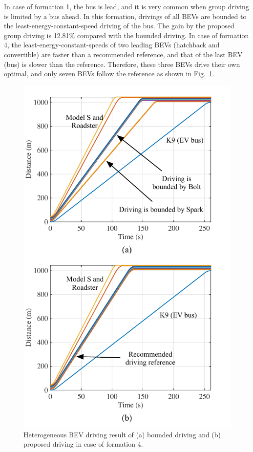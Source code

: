 \documentclass{IEEEtran}
\begin{document}
In case of formation 1, the bus is lead, and it is very common when group driving is limited by a bus ahead. In this formation, drivings of all BEVs are bounded to the least-energy-constant-speed driving of the bus. The gain by the proposed group driving is 12.81\% compared with the bounded driving.
In case of formation 4, the least-energy-constant-speeds of two leading BEVs (hatchback and convertible) are faster than a recommended reference, and that of the last BEV (bus) is slower than the reference. Therefore, these three BEVs drive their own optimal, and only seven BEVs follow the reference as shown in Fig.~\ref{fig:driving_comp}.

\begin{figure}	%
\centering
\includegraphics[width=1.0\hsize]{Figures/Driving_comparison.pdf}
\caption{Heterogeneous BEV driving result of  (a) bounded driving and (b) proposed driving in case of formation 4.}
\label{fig:driving_comp}
\end{figure} 
\end{document}

